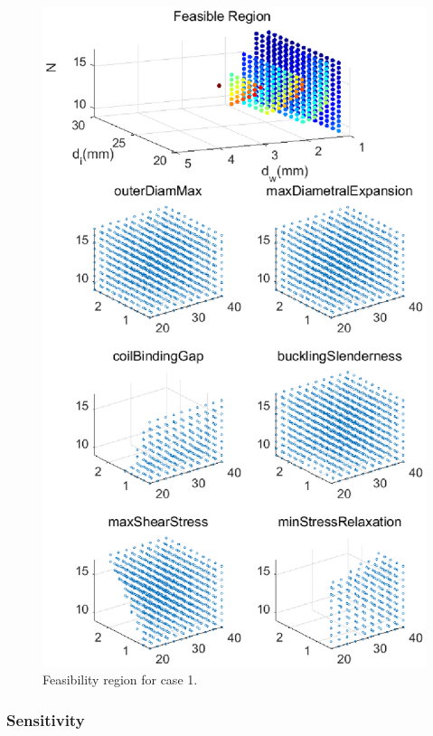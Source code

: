 \documentclass[10pt]{article}
\begin{document}
			\begin{figure}[H]
		 \begin{center}\includegraphics[scale=.5]{Case_56_34891011new.eps}\end{center}
		 \caption{Feasibility region for case 1.}
		 \label{Feasibility region for case 1.}
		 \end{figure}
		 
\subsubsection{Sensitivity}		
 
\end{document}
